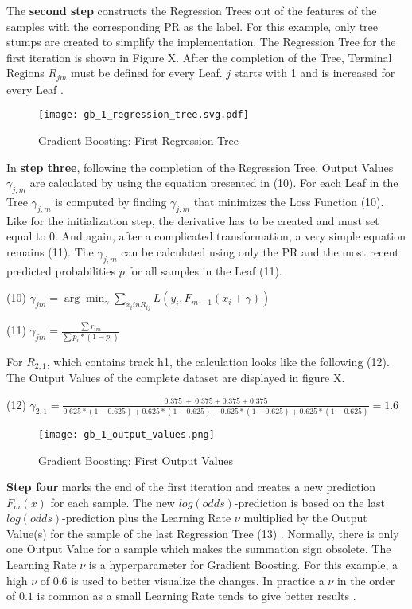 The \textbf{second step} constructs the Regression Trees out of the features of the samples with the corresponding 
PR as the label. For this example, only tree stumps are created to simplify the implementation. 
The Regression Tree for the first iteration is shown in Figure X. After the completion of the 
Tree, Terminal Regions \(R_{jm}\) must be defined for every Leaf. \(j\) starts with 1 and is increased for 
every Leaf \cite[p.1195]{Friedman_2001}. 

\begin{figure}[H]
    \centering
    \caption[]{Gradient Boosting: First Regression Tree}
	\label{gb_1_regression_tree}
    \texttt{[image: gb\_1\_regression\_tree.svg.pdf]}
\end{figure}

In \textbf{step three}, following the completion of the Regression Tree, Output Values \(\gamma_{j, m}\) are calculated by using 
the equation presented in (10). For each Leaf in the Tree \(\gamma_{j, m}\) is computed by finding 
\(\gamma_{j, m}\) that minimizes the Loss Function (10). Like for the initialization step, the derivative has 
to be created and must set equal to \(0\). And again, after a complicated transformation, a very simple 
equation remains (11). The \(\gamma_{j, m}\)  can be calculated using only the PR and the most 
recent predicted probabilities \(p\) for all samples in the Leaf (11). 

(10) \(\gamma_{jm} = \arg \min_{\gamma}\sum_{x_{i} in R_{ij}} L(y_{i},F_{m-1}(x_{i} + \gamma)) \)

(11) \(\gamma_{jm} = \frac{ \sum r_{im}}{\sum p_{i} * (1 - p_{i})} \) 

For \(R_{2,1}\), which contains track h1, the calculation looks like the following (12). The Output Values of the complete 
dataset are displayed in figure X. 

(12) \(\gamma_{2,1} = \frac{0.375 ~ + ~ 0.375+0.375+0.375}{0.625 * (1 - 0.625) + 0.625 * (1 - 0.625) + 0.625 * (1 - 0.625) + 0.625 * (1 - 0.625)} 
                    = 1.6 \)

\begin{figure}[H]
    \centering
    \caption[]{Gradient Boosting: First Output Values}
	\label{gb_1_output_values}
    \texttt{[image: gb\_1\_output\_values.png]}
\end{figure}

\textbf{Step four} marks the end of the first iteration and creates a new prediction \(F_{m}(x)\) for each sample. 
The new \(log(odds)\)-prediction is based on the last \(log(odds)\)-prediction plus the Learning Rate \(\nu\) multiplied by 
the Output Value(s) for the sample of the last Regression Tree (13) \cite[p.1203]{Friedman_2001}. Normally, there is only one 
Output Value for a sample which makes the summation sign obsolete. The Learning Rate \(\nu\) is a 
hyperparameter for Gradient Boosting. For this example, a high \(\nu\) of \(0.6\) is used to better visualize 
the changes. In practice a \(\nu \) in the order of \(0.1\) is common as a small Learning Rate tends to
give better results \cite[p.1206]{Friedman_2001}. 

